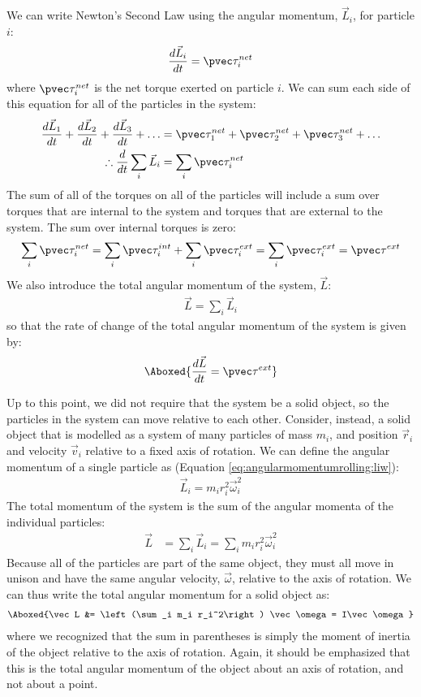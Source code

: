 We can write Newton's Second Law using the angular momentum, $\vec L_i$, for particle $i$:
\begin{align*}
\frac{d\vec L_i}{dt} = \pvec \tau_i^{net}
\end{align*}
where $\pvec \tau_i^{net}$ is the net torque exerted on particle $i$. We can sum each side of this equation for all of the particles in the system:
\begin{align*}
\frac{d\vec L_1}{dt} + \frac{d\vec L_2}{dt} + \frac{d\vec L_3}{dt} + \dots &= \pvec \tau_1^{net} + \pvec \tau_2^{net} +\pvec \tau_3^{net} + \dots\\
\therefore \frac{d}{dt} \sum_i\vec L_i &= \sum_i \pvec \tau_i^{net}
\end{align*}
The sum of all of the torques on all of the particles will include a sum over torques that are internal to the system and torques that are external to the system. The sum over internal torques is zero:
\begin{align*}
\sum_i \pvec\tau_i^{net} = \sum_i \pvec\tau_i^{int} + \sum_i \pvec\tau_i^{ext} = \sum_i \pvec\tau_i^{ext} = \pvec\tau^{ext}
\end{align*}
We also introduce the total angular momentum of the system, $\vec L$:
\begin{align*}
\vec L = \sum_i\vec L_i
\end{align*}
so that the rate of change of the total angular momentum of the system is given by:
\begin{align}
\Aboxed{\frac{d\vec L}{dt} = \pvec \tau^{ext}}
\end{align}

Up to this point, we did not require that the system be a solid object, so the particles in the system can move relative to each other. Consider, instead, a solid object that is modelled as a system of many particles of mass $m_i$, and position $\vec r_i$ and velocity $\vec v_i$ relative to a fixed axis of rotation. We can define the angular momentum of a single particle as (Equation \ref{eq:angularmomentumrolling:liw}):
\begin{align*}
\vec L_i = m_i r_i^2 \vec \omega_i^2
\end{align*}
The total momentum of the system is the sum of the angular momenta of the individual particles:
\begin{align*}
\vec L &= \sum_i\vec L_i = \sum_i  m_i r_i^2 \vec \omega_i^2
\end{align*}
Because all of the particles are part of the same object, they must all move in unison and have the same angular velocity, $\vec\omega$, relative to the axis of rotation. We can thus write the total angular momentum for a solid object as:
\begin{align}
\Aboxed{\vec L &= \left(\sum_i  m_i r_i^2\right) \vec \omega = I\vec\omega}
\end{align}
where we recognized that the sum in parentheses is simply the moment of inertia of the object relative to the axis of rotation. Again, it should be emphasized that this is the total angular momentum of the object about an axis of rotation, and not about a point. 


